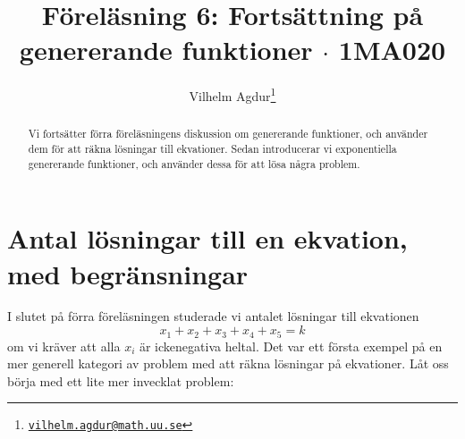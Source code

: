 \documentclass[nobib]{tufte-handout}
\title{Föreläsning 6: Fortsättning på genererande funktioner $\cdot$ 1MA020}
\author[Vilhelm Agdur]{Vilhelm Agdur\thanks{\href{mailto:vilhelm.agdur@math.uu.se}{\nolinkurl{vilhelm.agdur@math.uu.se}}}}
\begin{document}

\maketitle%

\begin{abstract}
\noindent
Vi fortsätter förra föreläsningens diskussion om genererande funktioner, och använder dem för att räkna lösningar till ekvationer. Sedan introducerar vi exponentiella genererande funktioner, och använder dessa för att lösa några problem.
\end{abstract}

\section{Antal lösningar till en ekvation, med begränsningar}

I slutet på förra föreläsningen studerade vi antalet lösningar till ekvationen
$$x_1 + x_2 + x_3 + x_4 + x_5 = k$$
om vi kräver att alla $x_i$ är ickenegativa heltal. Det var ett första exempel på en mer generell kategori av problem med att räkna lösningar på ekvationer. Låt oss börja med ett lite mer invecklat problem:
\end{document}

